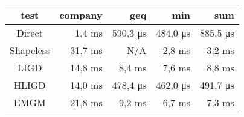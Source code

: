 \begin{tabular}{c|r|r|r|r}
\bf{test}  & \bf{company}    & \bf{geq}        & \bf{min}        & \bf{sum}       \\
\hline
Direct     &          1,4 ms &        590,3 μs &        484,0 μs &        885,5 μs\\
Shapeless  &         31,7 ms &             N/A &          2,8 ms &          3,2 ms\\
LIGD       &         14,8 ms &          8,4 ms &          7,6 ms &          8,8 ms\\
HLIGD      &         14,0 ms &        478,4 μs &        462,0 μs &        491,7 μs\\
EMGM       &         21,8 ms &          9,2 ms &          6,7 ms &          7,3 ms\\
\end{tabular}
